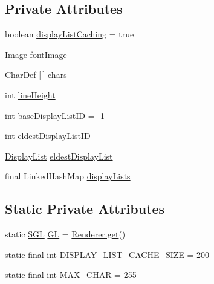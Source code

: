 \subsection*{Private Attributes}
\begin{DoxyCompactItemize}
\item 
boolean \mbox{\hyperlink{classorg_1_1newdawn_1_1slick_1_1_angel_code_font_a1b429bd8175e017d9df97818af84cb06}{display\+List\+Caching}} = true
\item 
\mbox{\hyperlink{classorg_1_1newdawn_1_1slick_1_1_image}{Image}} \mbox{\hyperlink{classorg_1_1newdawn_1_1slick_1_1_angel_code_font_a891bf3b2a299313dc4f37c3808982aba}{font\+Image}}
\item 
\mbox{\hyperlink{classorg_1_1newdawn_1_1slick_1_1_angel_code_font_1_1_char_def}{Char\+Def}} \mbox{[}$\,$\mbox{]} \mbox{\hyperlink{classorg_1_1newdawn_1_1slick_1_1_angel_code_font_acdb3d26438f0f30d33db0a543715a3b1}{chars}}
\item 
int \mbox{\hyperlink{classorg_1_1newdawn_1_1slick_1_1_angel_code_font_a79b1b71568fb19eaed6dea5babc6e752}{line\+Height}}
\item 
int \mbox{\hyperlink{classorg_1_1newdawn_1_1slick_1_1_angel_code_font_af768584a5e95470e18937a431dd4bcb1}{base\+Display\+List\+ID}} = -\/1
\item 
int \mbox{\hyperlink{classorg_1_1newdawn_1_1slick_1_1_angel_code_font_ac8dc56c5ce3f951729b7239efd3811df}{eldest\+Display\+List\+ID}}
\item 
\mbox{\hyperlink{classorg_1_1newdawn_1_1slick_1_1_angel_code_font_1_1_display_list}{Display\+List}} \mbox{\hyperlink{classorg_1_1newdawn_1_1slick_1_1_angel_code_font_a82733df33c4098515ea0a832ca7218da}{eldest\+Display\+List}}
\item 
final Linked\+Hash\+Map \mbox{\hyperlink{classorg_1_1newdawn_1_1slick_1_1_angel_code_font_ad2583887204ad560daf5546b8eb6ee7d}{display\+Lists}}
\end{DoxyCompactItemize}
\subsection*{Static Private Attributes}
\begin{DoxyCompactItemize}
\item 
static \mbox{\hyperlink{interfaceorg_1_1newdawn_1_1slick_1_1opengl_1_1renderer_1_1_s_g_l}{S\+GL}} \mbox{\hyperlink{classorg_1_1newdawn_1_1slick_1_1_angel_code_font_a22c7ebf9e7aad9665c6866438b675da2}{GL}} = \mbox{\hyperlink{classorg_1_1newdawn_1_1slick_1_1opengl_1_1renderer_1_1_renderer_abe742c3a7dfca67c6c01821d27087308}{Renderer.\+get}}()
\item 
static final int \mbox{\hyperlink{classorg_1_1newdawn_1_1slick_1_1_angel_code_font_a493a4a9c0c402ad916d51ef38b66e036}{D\+I\+S\+P\+L\+A\+Y\+\_\+\+L\+I\+S\+T\+\_\+\+C\+A\+C\+H\+E\+\_\+\+S\+I\+ZE}} = 200
\item 
static final int \mbox{\hyperlink{classorg_1_1newdawn_1_1slick_1_1_angel_code_font_ab0bebe07d0e5a16dbccf3e99c2229f1a}{M\+A\+X\+\_\+\+C\+H\+AR}} = 255
\end{DoxyCompactItemize}


